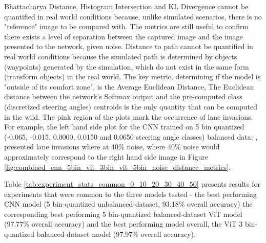 Bhattacharya Distance, Histogram Intersection and KL Divergence cannot be quantified in real world conditions because, unlike simulated scenarios, there is no "reference" image to be compared with. The metrics are still useful to confirm there exists a level of separation between the captured image and the image presented to the network, given noise. Distance to path cannot be quantified in real world conditions because the simulated path is determined by objects (waypoints) generated by the simulation, which do not exist in the same form (transform objects) in the real world. The key metric, determining if the model is "outside of its comfort zone", is the Average Euclidean Distance, The Euclidean distance between the network's Softmax output and the pre-computed class (discretized steering angles) centroids is the only quantity that can be computed in the wild.
The pink region of the plots mark the occurrence of lane invasions. For example, the left hand side plot for the CNN trained on 5 bin quantized (-0.065, -0.015, 0.0000, 0.0150 and 0.0650 steering angle classes) balanced data: , presented lane invasions where at 40\% noise, where 40\% noise would approximately correspond to the right hand side image in Figure \ref{fig:combined_cnn_5bin_vit_3bin_vit_5bin_noise_distance_metrics}. 

Table \ref{tab:experiment_stats_common_0_10_20_30_40_50} presents results for experiments that were common to the three models tested - the best performing CNN model (5 bin-quantized unbalanced-dataset, 93.18\% overall accuracy) the corresponding best performing 5 bin-quantized balanced-dataset ViT model (97.77\% overall accuracy) and the best performing model overall, the ViT 3 bin-quantized balanced-dataset model (97.97\% overall accuracy).

